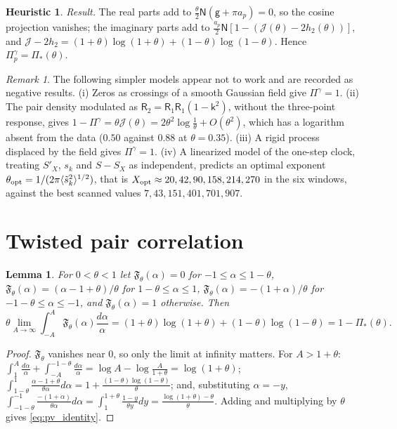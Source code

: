 \documentclass[11pt,reqno]{amsart}
\numberwithin{equation}{section}
\theoremstyle{plain}
\newtheorem{lemma}[theorem]{Lemma}
\theoremstyle{definition}
\newtheorem{heuristic}[theorem]{Heuristic}
\theoremstyle{remark}
\newtheorem{remark}[theorem]{Remark}
\newcommand{\sk}{\mathsf k}
\begin{document}
\begin{heuristic}
\emph{Result.} The real parts add to $\frac\theta2\mathsf N(\mathsf g+\pi a_p)=0$, so the cosine projection vanishes; the imaginary parts add to $\frac{a_p}2\mathsf N[1-(\mathcal J(\theta)-2h_2(\theta))]$, and $\mathcal J-2h_2=(1+\theta)\log(1+\theta)+(1-\theta)\log(1-\theta)$. Hence $\Pi^\gamma_p=\Pi_*(\theta)$.
\end{heuristic}

\begin{remark}\label{rem:model_failed}
The following simpler models appear not to work and are recorded as negative results. (i) Zeros as crossings of a smooth Gaussian field give $\Pi^\gamma=1$. (ii) The pair density modulated as $\mathsf R_2=\mathsf R_1\mathsf R_1(1-\sk^2)$, without the three-point response, gives $1-\Pi^\gamma=\theta\mathcal J(\theta)=2\theta^2\log\frac1\theta+O(\theta^2)$, which has a logarithm absent from the data ($0.50$ against $0.88$ at $\theta=0.35$). (iii) A rigid process displaced by the field gives $\Pi^\gamma=1$. (iv) A linearized model of the one-step clock, treating $S'_X$, $s_k$ and $S-S_X$ as independent, predicts an optimal exponent $\theta_{\rm opt}=1/(2\pi\langle\tilde s_k^2\rangle^{1/2})$, that is $X_{\rm opt}\approx20,42,90,158,214,270$ in the six windows, against the best scanned values $7,43,151,401,701,907$.
\end{remark}

\section{Twisted pair correlation}
\label{sec:appendix_twisted}

\begin{lemma}\label{lem:pv_identity}
For $0<\theta<1$ let $\mathfrak F_\theta(\alpha)=0$ for $-1\le\alpha\le1-\theta$, $\mathfrak F_\theta(\alpha)=(\alpha-1+\theta)/\theta$ for $1-\theta\le\alpha\le1$, $\mathfrak F_\theta(\alpha)=-(1+\alpha)/\theta$ for $-1-\theta\le\alpha\le-1$, and $\mathfrak F_\theta(\alpha)=1$ otherwise. Then
\begin{equation}
\theta\lim_{A\to\infty}\int_{-A}^{A}\mathfrak F_\theta(\alpha)\frac{d\alpha}\alpha=(1+\theta)\log(1+\theta)+(1-\theta)\log(1-\theta)=1-\Pi_*(\theta).
\label{eq:pv_identity}
\end{equation}
\end{lemma}

\begin{proof}
$\mathfrak F_\theta$ vanishes near $0$, so only the limit at infinity matters. For $A>1+\theta$: $\int_1^A\frac{d\alpha}\alpha+\int_{-A}^{-1-\theta}\frac{d\alpha}\alpha=\log A-\log\frac A{1+\theta}=\log(1+\theta)$; $\int_{1-\theta}^1\frac{\alpha-1+\theta}{\theta\alpha}d\alpha=1+\frac{(1-\theta)\log(1-\theta)}\theta$; and, substituting $\alpha=-y$, $\int_{-1-\theta}^{-1}\frac{-(1+\alpha)}{\theta\alpha}d\alpha=\int_1^{1+\theta}\frac{1-y}{\theta y}dy=\frac{\log(1+\theta)-\theta}\theta$. Adding and multiplying by $\theta$ gives \eqref{eq:pv_identity}.
\end{proof}
\end{document}
